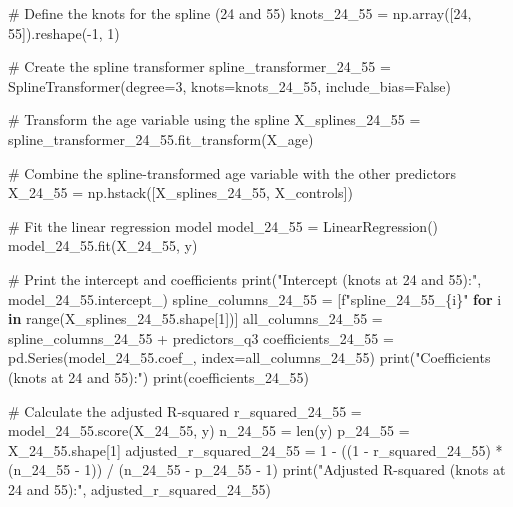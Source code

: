 \documentclass[
  11pt,
  letterpaper,
  DIV=11,
  numbers=noendperiod]{scrartcl}
\newenvironment{Shaded}{\begin{snugshade}}{\end{snugshade}}
\newcommand{\BuiltInTok}[1]{\textcolor[rgb]{0.00,0.23,0.31}{#1}}
\newcommand{\CommentTok}[1]{\textcolor[rgb]{0.37,0.37,0.37}{#1}}
\newcommand{\ControlFlowTok}[1]{\textcolor[rgb]{0.00,0.23,0.31}{\textbf{#1}}}
\newcommand{\DecValTok}[1]{\textcolor[rgb]{0.68,0.00,0.00}{#1}}
\newcommand{\KeywordTok}[1]{\textcolor[rgb]{0.00,0.23,0.31}{\textbf{#1}}}
\newcommand{\NormalTok}[1]{\textcolor[rgb]{0.00,0.23,0.31}{#1}}
\newcommand{\OperatorTok}[1]{\textcolor[rgb]{0.37,0.37,0.37}{#1}}
\newcommand{\SpecialCharTok}[1]{\textcolor[rgb]{0.37,0.37,0.37}{#1}}
\newcommand{\SpecialStringTok}[1]{\textcolor[rgb]{0.13,0.47,0.30}{#1}}
\newcommand{\StringTok}[1]{\textcolor[rgb]{0.13,0.47,0.30}{#1}}
\newcommand{\VariableTok}[1]{\textcolor[rgb]{0.07,0.07,0.07}{#1}}
\begin{document}
\begin{Shaded}
\begin{Highlighting}[]
\CommentTok{\# Define the knots for the spline (24 and 55)}
\NormalTok{knots\_24\_55 }\OperatorTok{=}\NormalTok{ np.array([}\DecValTok{24}\NormalTok{, }\DecValTok{55}\NormalTok{]).reshape(}\OperatorTok{{-}}\DecValTok{1}\NormalTok{, }\DecValTok{1}\NormalTok{)}

\CommentTok{\# Create the spline transformer}
\NormalTok{spline\_transformer\_24\_55 }\OperatorTok{=}\NormalTok{ SplineTransformer(degree}\OperatorTok{=}\DecValTok{3}\NormalTok{, knots}\OperatorTok{=}\NormalTok{knots\_24\_55, include\_bias}\OperatorTok{=}\VariableTok{False}\NormalTok{)}

\CommentTok{\# Transform the age variable using the spline}
\NormalTok{X\_splines\_24\_55 }\OperatorTok{=}\NormalTok{ spline\_transformer\_24\_55.fit\_transform(X\_age)}

\CommentTok{\# Combine the spline{-}transformed age variable with the other predictors}
\NormalTok{X\_24\_55 }\OperatorTok{=}\NormalTok{ np.hstack([X\_splines\_24\_55, X\_controls])}

\CommentTok{\# Fit the linear regression model}
\NormalTok{model\_24\_55 }\OperatorTok{=}\NormalTok{ LinearRegression()}
\NormalTok{model\_24\_55.fit(X\_24\_55, y)}

\CommentTok{\# Print the intercept and coefficients}
\BuiltInTok{print}\NormalTok{(}\StringTok{"Intercept (knots at 24 and 55):"}\NormalTok{, model\_24\_55.intercept\_)}
\NormalTok{spline\_columns\_24\_55 }\OperatorTok{=}\NormalTok{ [}\SpecialStringTok{f"spline\_24\_55\_}\SpecialCharTok{\{}\NormalTok{i}\SpecialCharTok{\}}\SpecialStringTok{"} \ControlFlowTok{for}\NormalTok{ i }\KeywordTok{in} \BuiltInTok{range}\NormalTok{(X\_splines\_24\_55.shape[}\DecValTok{1}\NormalTok{])]}
\NormalTok{all\_columns\_24\_55 }\OperatorTok{=}\NormalTok{ spline\_columns\_24\_55 }\OperatorTok{+}\NormalTok{ predictors\_q3}
\NormalTok{coefficients\_24\_55 }\OperatorTok{=}\NormalTok{ pd.Series(model\_24\_55.coef\_, index}\OperatorTok{=}\NormalTok{all\_columns\_24\_55)}
\BuiltInTok{print}\NormalTok{(}\StringTok{"Coefficients (knots at 24 and 55):"}\NormalTok{)}
\BuiltInTok{print}\NormalTok{(coefficients\_24\_55)}

\CommentTok{\# Calculate the adjusted R{-}squared}
\NormalTok{r\_squared\_24\_55 }\OperatorTok{=}\NormalTok{ model\_24\_55.score(X\_24\_55, y)}
\NormalTok{n\_24\_55 }\OperatorTok{=} \BuiltInTok{len}\NormalTok{(y)}
\NormalTok{p\_24\_55 }\OperatorTok{=}\NormalTok{ X\_24\_55.shape[}\DecValTok{1}\NormalTok{]}
\NormalTok{adjusted\_r\_squared\_24\_55 }\OperatorTok{=} \DecValTok{1} \OperatorTok{{-}}\NormalTok{ ((}\DecValTok{1} \OperatorTok{{-}}\NormalTok{ r\_squared\_24\_55) }\OperatorTok{*}\NormalTok{ (n\_24\_55 }\OperatorTok{{-}} \DecValTok{1}\NormalTok{)) }\OperatorTok{/}\NormalTok{ (n\_24\_55 }\OperatorTok{{-}}\NormalTok{ p\_24\_55 }\OperatorTok{{-}} \DecValTok{1}\NormalTok{)}
\BuiltInTok{print}\NormalTok{(}\StringTok{"Adjusted R{-}squared (knots at 24 and 55):"}\NormalTok{, adjusted\_r\_squared\_24\_55)}
\end{Highlighting}
\end{Shaded}
\end{document}
